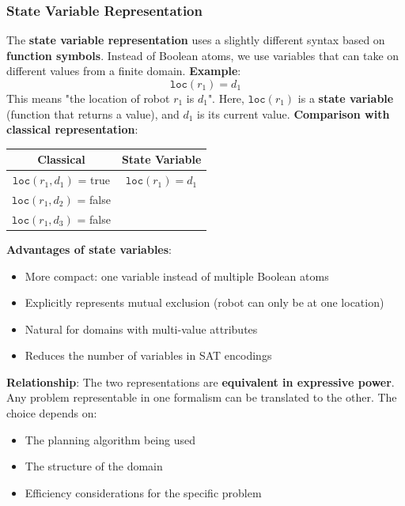 \documentclass[a4paper]{article}
\theoremstyle{definition}
\begin{document}
\subsubsection{State Variable Representation}
The \textbf{state variable representation} uses a slightly different syntax based on \textbf{function symbols}. Instead of Boolean atoms, 
we use variables that can take on different values from a finite domain.
\vspace{1em}
\noindent
\newline
\textbf{Example}:
\[
  \texttt{loc}(r_1) = d_1
\]
This means "the location of robot \( r_1 \) is \( d_1 \)". Here, \( \texttt{loc}(r_1) \) is a \textbf{state variable} (function that returns a value), 
and \( d_1 \) is its current value.  
\vspace{1em}
\noindent
\newline
\textbf{Comparison with classical representation}:
\begin{center}
    \begin{tabular}{ |c|c| }
        \hline
        \textbf{Classical} & \textbf{State Variable} \\
        \hline
        \( \texttt{loc}(r_1,d_1) \) = true & \( \texttt{loc}(r_1) = d_1 \) \\
        \( \texttt{loc}(r_1,d_2) \) = false & \\
        \( \texttt{loc}(r_1,d_3) \) = false & \\
        \hline
    \end{tabular}
\end{center}
\textbf{Advantages of state variables}:
\begin{itemize}
    \item More compact: one variable instead of multiple Boolean atoms 
    \item Explicitly represents mutual exclusion (robot can only be at one location)
    \item Natural for domains with multi-value attributes 
    \item Reduces the number of variables in SAT encodings 
\end{itemize}
\textbf{Relationship}: The two representations are \textbf{equivalent in expressive power}. Any problem representable in one 
formalism can be translated to the other. The choice depends on:
\begin{itemize}
    \item The planning algorithm being used 
    \item The structure of the domain 
    \item Efficiency considerations for the specific problem
\end{itemize}
\end{document}
